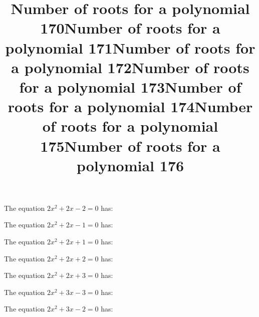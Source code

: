 \documentclass{article}
\begin{document}
\begin{category}
\begin{question}[multichoice]
\end{question}
\begin{question}[multichoice]
\title{Number of roots for a polynomial 170}
The equation $2 x^{2} + 2 x - 2=0$ has:



\end{question}
\begin{question}[multichoice]
\title{Number of roots for a polynomial 171}
The equation $2 x^{2} + 2 x - 1=0$ has:



\end{question}
\begin{question}[multichoice]
\title{Number of roots for a polynomial 172}
The equation $2 x^{2} + 2 x + 1=0$ has:



\end{question}
\begin{question}[multichoice]
\title{Number of roots for a polynomial 173}
The equation $2 x^{2} + 2 x + 2=0$ has:



\end{question}
\begin{question}[multichoice]
\title{Number of roots for a polynomial 174}
The equation $2 x^{2} + 2 x + 3=0$ has:



\end{question}
\begin{question}[multichoice]
\title{Number of roots for a polynomial 175}
The equation $2 x^{2} + 3 x - 3=0$ has:



\end{question}
\begin{question}[multichoice]
\title{Number of roots for a polynomial 176}
The equation $2 x^{2} + 3 x - 2=0$ has:


\end{question}
\end{category}
\end{document}
